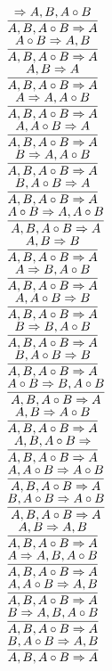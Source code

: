 \documentclass[11pt]{article}
\begin{document}
\begin{center}
\bigskip
\\$\infer{A, B, A\circ B\Rightarrow A}{\Rightarrow A, B, A\circ B}$
\bigskip
\\$\infer{A, B, A\circ B\Rightarrow A}{A\circ B\Rightarrow A, B}$
\bigskip
\\$\infer{A, B, A\circ B\Rightarrow A}{A, B\Rightarrow A}$
\bigskip
\\$\infer{A, B, A\circ B\Rightarrow A}{A\Rightarrow A, A\circ B}$
\bigskip
\\$\infer{A, B, A\circ B\Rightarrow A}{A, A\circ B\Rightarrow A}$
\bigskip
\\$\infer{A, B, A\circ B\Rightarrow A}{B\Rightarrow A, A\circ B}$
\bigskip
\\$\infer{A, B, A\circ B\Rightarrow A}{B, A\circ B\Rightarrow A}$
\bigskip
\\$\infer{A, B, A\circ B\Rightarrow A}{A\circ B\Rightarrow A, A\circ B}$
\bigskip
\\$\infer{A, B, A\circ B\Rightarrow A}{A, B\Rightarrow B}$
\bigskip
\\$\infer{A, B, A\circ B\Rightarrow A}{A\Rightarrow B, A\circ B}$
\bigskip
\\$\infer{A, B, A\circ B\Rightarrow A}{A, A\circ B\Rightarrow B}$
\bigskip
\\$\infer{A, B, A\circ B\Rightarrow A}{B\Rightarrow B, A\circ B}$
\bigskip
\\$\infer{A, B, A\circ B\Rightarrow A}{B, A\circ B\Rightarrow B}$
\bigskip
\\$\infer{A, B, A\circ B\Rightarrow A}{A\circ B\Rightarrow B, A\circ B}$
\bigskip
\\$\infer{A, B, A\circ B\Rightarrow A}{A, B\Rightarrow A\circ B}$
\bigskip
\\$\infer{A, B, A\circ B\Rightarrow A}{A, B, A\circ B\Rightarrow }$
\bigskip
\\$\infer{A, B, A\circ B\Rightarrow A}{A, A\circ B\Rightarrow A\circ B}$
\bigskip
\\$\infer{A, B, A\circ B\Rightarrow A}{B, A\circ B\Rightarrow A\circ B}$
\bigskip
\\$\infer{A, B, A\circ B\Rightarrow A}{A, B\Rightarrow A, B}$
\bigskip
\\$\infer{A, B, A\circ B\Rightarrow A}{A\Rightarrow A, B, A\circ B}$
\bigskip
\\$\infer{A, B, A\circ B\Rightarrow A}{A, A\circ B\Rightarrow A, B}$
\bigskip
\\$\infer{A, B, A\circ B\Rightarrow A}{B\Rightarrow A, B, A\circ B}$
\bigskip
\\$\infer{A, B, A\circ B\Rightarrow A}{B, A\circ B\Rightarrow A, B}$

\end{center}
\end{document}
